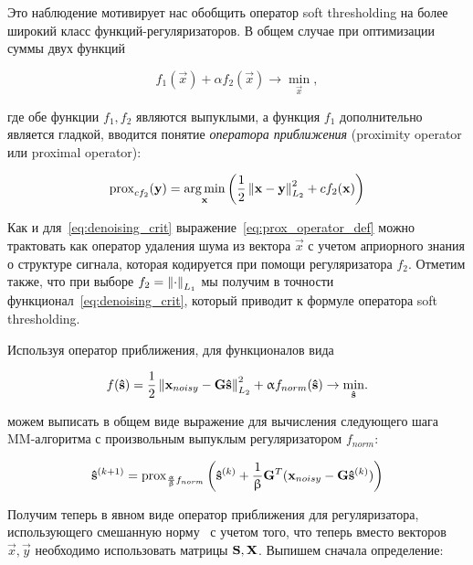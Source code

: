 Это наблюдение мотивирует нас обобщить оператор soft thresholding на
более широкий класс функций-регуляризаторов. В общем случае
при оптимизации суммы двух функций

\begin{equation}
    f_1(\vec{x}) + \alpha f_2(\vec{x}) \rightarrow \underset{\vec{x}}\min,
\end{equation}

где обе функции $f_1, f_2$ являются выпуклыми, а функция $f_1$ дополнительно
является гладкой, вводится понятие \emph{оператора приближения} (proximity
operator или proximal operator):

\begin{equation}
    \operatorname{prox}_{c f_2}(\mathbf{y}) = \operatorname*{arg\,min}_{\mathbf{x}}\left(\frac{1}{2}\left\lVert\mathbf{x - y}\right\rVert^2_{L_2} + c f_2(\mathbf{x})\right)
    \label{eq:prox_operator_def}
\end{equation}

Как и для~\ref{eq:denoising_crit} выражение~\ref{eq:prox_operator_def} можно
трактовать как оператор удаления шума из вектора $\vec{x}$ с учетом априорного
знания о структуре сигнала, которая кодируется при помощи регуляризатора $f_2$.
Отметим также, что при выборе $f_2 = \left\lVert\cdot\right\rVert_{L_1}$ мы получим в точности
функционал~\ref{eq:denoising_crit}, который приводит к формуле оператора
soft thresholding.

Используя оператор приближения, для функционалов вида

\begin{equation}
    f(\mathbf{\hat{s}}) = \frac{1}{2}\left\lVert\mathbf{x}_{noisy} - \mathbf{G}\mathbf{\hat{s}}\right\rVert^2_{L_2} + \upalpha f_{norm}(\mathbf{\hat{s}})
    \rightarrow \underset{\mathbf{\hat{s}}}{\min}.
    \label{eq:abstract_reg_func_crit}
\end{equation}

можем выписать в общем виде выражение для вычисления следующего шага
MM-алгоритма с произвольным выпуклым регуляризатором $f_{norm}$:

\begin{equation}
    \mathbf{\hat{s}}^{(k+1)} =
    \operatorname{prox}_{\frac{\upalpha}{\upbeta} f_{norm}}\left(\mathbf{\hat{s}}^{(k)} + \frac{1}{\upbeta} \mathbf{G}^T(\mathbf{x}_{noisy} - \mathbf{G} \mathbf{\hat{s}}^{(k)})\right)
    \label{eq:mm_next_iter_prox}
\end{equation}

Получим теперь в явном виде оператор приближения для регуляризатора,
использующего смешанную норму~\cite{Gramfort2012} с учетом того, что теперь
вместо векторов $\vec{x}, \vec{y}$ необходимо использовать матрицы $\mathbf{S},
\mathbf{X}$. Выпишем сначала определение:

